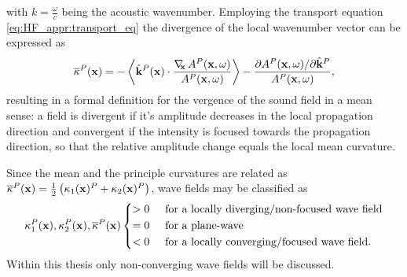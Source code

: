 with $k = \frac{\omega}{c}$ being the acoustic wavenumber.
Employing the transport equation \eqref{eq:HF_appr:transport_eq} the divergence of the local wavenumber vector can be expressed as
\begin{equation}
\overline{\kappa}^P(\mathbf{x}) = -\left< \hat{\mathbf{k}}^P(\mathbf{x})\cdot \frac{ \nabla_{\!\!\mathbf{x}}\, A^P(\mathbf{x},\omega) }{A^P(\mathbf{x},\omega)}\right>
-\frac{ \partial A^P(\mathbf{x},\omega) / \partial \hat{\mathbf{k}}^P }{ A^P(\mathbf{x},\omega)},
\end{equation}
resulting in a formal definition for the vergence of the sound field in a mean sense: a field is divergent if it's amplitude decreases in the local propagation direction and convergent if the intensity is focused towards the propagation direction, so that the relative amplitude change equals the local mean curvature.

Since the mean and the principle curvatures are related as $\overline{\kappa}^P(\mathbf{x})  = \frac{1}{2} \left( \kappa_1(\mathbf{x})^P+\kappa_2(\mathbf{x})^P \right)$, wave fields may be classified as
\begin{equation}
\label{eq:HF_appr:curvature_cases}
\kappa_1^P(\vx),\kappa_2^P(\vx),\overline{\kappa}^P(\vx) 
\begin{cases*}
> 0  \hspace{5mm} \text{for a locally diverging/non-focused wave field} \\
= 0  \hspace{5mm} \text{for a plane-wave}  \\
< 0  \hspace{5mm} \text{for a locally converging/focused wave field.} 
\end{cases*}
\end{equation}
Within this thesis only non-converging wave fields will be discussed.

